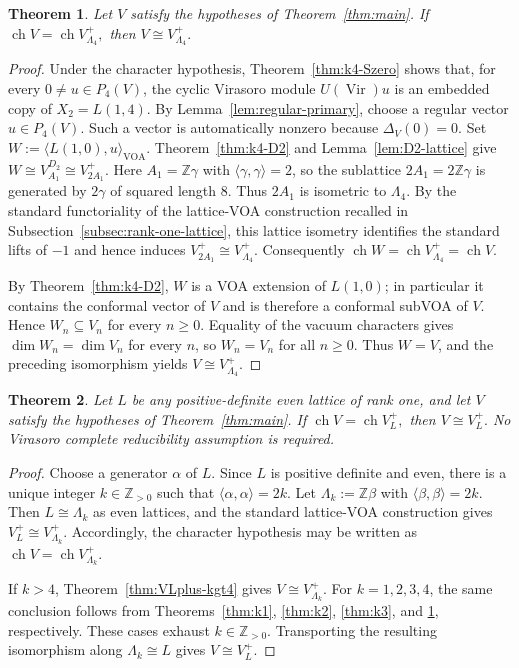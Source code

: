 \documentclass[10pt,a4paper]{amsart}
\numberwithin{equation}{section} \newtheorem{thm}{Theorem}[section] \newtheorem{lem}[thm]{Lemma} \newtheorem{ex}[thm]{Example} \newtheorem{prop}[thm]{Proposition} \newtheorem{cor}[thm]{Corollary} \newtheorem{defi}[thm]{Definition} \newtheorem{rmk}[thm]{Remark} \newtheorem{notation}[thm]{Notation}
\newcommand{\Vir}{\operatorname{Vir}}
\newcommand{\ch}{\operatorname{ch}}
\def\Z{\mathbb{Z}} \def\N{\mathbb{N}} \def\A{\mathbb{A}} \def\C{\mathbb{C}} \def\R{\mathbb{R}} \def\Q{\mathbb{Q}} \def\F{\mathbb{F}}
\begin{document}
\begin{thm}\label{thm:k4}
Let $V$ satisfy the hypotheses of Theorem~\ref{thm:main}. If \(\ch V=\ch V_{\Lambda_4}^+,\) then \(V\cong V_{\Lambda_4}^+.\)
\end{thm}

\begin{proof}
Under the character hypothesis, Theorem~\ref{thm:k4-Szero} shows that, for every $0\ne u\in P_4(V)$, the cyclic Virasoro module $U(\Vir)u$ is an embedded copy of $X_2=L(1,4)$. By Lemma~\ref{lem:regular-primary}, choose a regular vector $u\in P_4(V)$. Such a vector is automatically nonzero because $\Delta_V(0)=0$. Set \(W:=\langle L(1,0),u\rangle_{\mathrm{VOA}}.\) Theorem~\ref{thm:k4-D2} and Lemma~\ref{lem:D2-lattice} give \(W\cong V_{A_1}^{D_2}\cong V_{2A_1}^+.\) Here $A_1=\Z\gamma$ with $\langle\gamma,\gamma\rangle=2$, so the sublattice $2A_1=2\Z\gamma$ is generated by $2\gamma$ of squared length $8$. Thus $2A_1$ is isometric to $\Lambda_4$. By the standard functoriality of the lattice-VOA construction recalled in Subsection~\ref{subsec:rank-one-lattice}, this lattice isometry identifies the standard lifts of $-1$ and hence induces \(V_{2A_1}^+\cong V_{\Lambda_4}^+.\) Consequently \(\ch W=\ch V_{\Lambda_4}^+=\ch V.\)

By Theorem~\ref{thm:k4-D2}, $W$ is a VOA extension of $L(1,0)$; in particular it contains the conformal vector of $V$ and is therefore a conformal subVOA of $V$. Hence $W_n\subseteq V_n$ for every $n\ge0$. Equality of the vacuum characters gives \(\dim W_n=\dim V_n\) for every $n$, so $W_n=V_n$ for all $n\ge0$. Thus $W=V$, and the preceding isomorphism yields \(V\cong V_{\Lambda_4}^+.\)
\end{proof}

\begin{thm}\label{thm:VLplus-all}
Let $L$ be any positive-definite even lattice of rank one, and let $V$ satisfy the hypotheses of Theorem~\ref{thm:main}. If \(\ch V=\ch V_L^+,\) then \(V\cong V_L^+.\) No Virasoro complete reducibility assumption is required.
\end{thm}

\begin{proof}
Choose a generator $\alpha$ of $L$. Since $L$ is positive definite and even, there is a unique integer $k\in\Z_{>0}$ such that \(\langle\alpha,\alpha\rangle=2k.\) Let $\Lambda_k:=\Z\beta$ with \(\langle\beta,\beta\rangle=2k.\) Then $L\cong\Lambda_k$ as even lattices, and the standard lattice-VOA construction gives \(V_L^+\cong V_{\Lambda_k}^+.\) Accordingly, the character hypothesis may be written as \(\ch V=\ch V_{\Lambda_k}^+.\)

If $k>4$, Theorem~\ref{thm:VLplus-kgt4} gives \(V\cong V_{\Lambda_k}^+.\) For $k=1,2,3,4$, the same conclusion follows from Theorems~\ref{thm:k1}, \ref{thm:k2}, \ref{thm:k3}, and \ref{thm:k4}, respectively. These cases exhaust $k\in\Z_{>0}$. Transporting the resulting isomorphism along $\Lambda_k\cong L$ gives \(V\cong V_L^+.\)
\end{proof}
\end{document}

